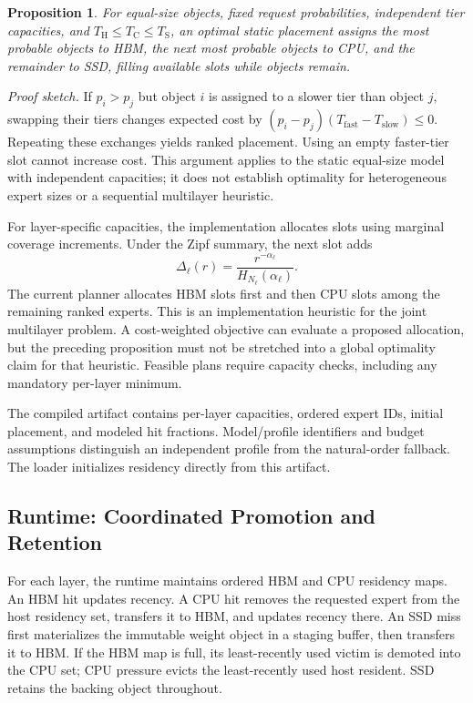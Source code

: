 \documentclass[conference,9pt,letterpaper]{IEEEtran}
\newtheorem{proposition}{Proposition}
\begin{document}
\begin{proposition}
For equal-size objects, fixed request probabilities, independent tier capacities, and $T_{\mathrm H}\le T_{\mathrm C}\le T_{\mathrm S}$, an optimal static placement assigns the most probable objects to HBM, the next most probable objects to CPU, and the remainder to SSD, filling available slots while objects remain.
\end{proposition}
\noindent\emph{Proof sketch.} If $p_i>p_j$ but object $i$ is assigned to a slower tier than object $j$, swapping their tiers changes expected cost by $(p_i-p_j)(T_{\mathrm{fast}}-T_{\mathrm{slow}})\le0$. Repeating these exchanges yields ranked placement. Using an empty faster-tier slot cannot increase cost. This argument applies to the static equal-size model with independent capacities; it does not establish optimality for heterogeneous expert sizes or a sequential multilayer heuristic.

For layer-specific capacities, the implementation allocates slots using marginal coverage increments. Under the Zipf summary, the next slot adds
\begin{equation}
 \Delta_{\ell}(r)=\frac{r^{-\alpha_\ell}}{H_{N_\ell}(\alpha_\ell)}.
\end{equation}
The current planner allocates HBM slots first and then CPU slots among the remaining ranked experts. This is an implementation heuristic for the joint multilayer problem. A cost-weighted objective can evaluate a proposed allocation, but the preceding proposition must not be stretched into a global optimality claim for that heuristic. Feasible plans require capacity checks, including any mandatory per-layer minimum.

The compiled artifact contains per-layer capacities, ordered expert IDs, initial placement, and modeled hit fractions. Model/profile identifiers and budget assumptions distinguish an independent profile from the natural-order fallback. The loader initializes residency directly from this artifact.

\subsection{Runtime: Coordinated Promotion and Retention}
For each layer, the runtime maintains ordered HBM and CPU residency maps. An HBM hit updates recency. A CPU hit removes the requested expert from the host residency set, transfers it to HBM, and updates recency there. An SSD miss first materializes the immutable weight object in a staging buffer, then transfers it to HBM. If the HBM map is full, its least-recently used victim is demoted into the CPU set; CPU pressure evicts the least-recently used host resident. SSD retains the backing object throughout.
\end{document}
